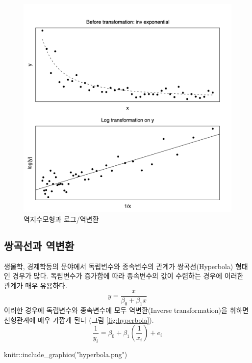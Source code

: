 \documentclass[
]{book}
\newenvironment{Shaded}{\begin{snugshade}}{\end{snugshade}}
\newcommand{\FunctionTok}[1]{\textcolor[rgb]{0.00,0.00,0.00}{#1}}
\newcommand{\NormalTok}[1]{#1}
\newcommand{\SpecialCharTok}[1]{\textcolor[rgb]{0.00,0.00,0.00}{#1}}
\newcommand{\StringTok}[1]{\textcolor[rgb]{0.31,0.60,0.02}{#1}}
\theoremstyle{definition}
\theoremstyle{definition}
\theoremstyle{definition}
\theoremstyle{remark}
\begin{document}
\begin{figure}
\includegraphics[width=0.8\linewidth]{invexp} \caption{역지수모형과 로그/역변환}\label{fig:invexpz}
\end{figure}

\hypertarget{uxc30duxace1uxc120uxacfc-uxc5eduxbcc0uxd658}{%
\subsection{쌍곡선과 역변환}\label{uxc30duxace1uxc120uxacfc-uxc5eduxbcc0uxd658}}

생물학, 경제학등의 문야에서 독립변수와 종속변수의 관계가 쌍곡선(Hyperbola) 형태인 경우가 많다. 독립변수가 증가함에 따라 종속변수의 값이 수렴하는 경우에 이러한 관계가 매우 유용하다.
\[ y = \frac{x}{\beta_0 + \beta_1 x} \]
이러한 경우에 독립변수와 종속변수에 모두 역변환(Inverse transformation)을 취하면 선형관계에 매우 가깝게 된다 (그림 \ref{fig:hyperbola}).
\[ \frac{1}{y_i} = \beta_0 + \beta_1 \left ( \frac{1}{x_i} \right ) + e_i \]

\begin{Shaded}
\begin{Highlighting}[]
\NormalTok{knitr}\SpecialCharTok{::}\FunctionTok{include\_graphics}\NormalTok{(}\StringTok{"hyperbola.png"}\NormalTok{)}
\end{Highlighting}
\end{Shaded}
\end{document}
